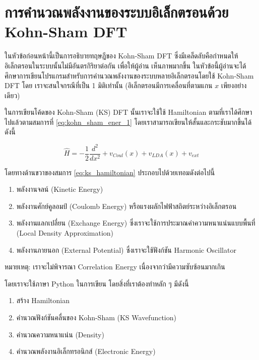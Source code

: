 \section{การคำนวณพลังงานของระบบอิเล็กตรอนด้วย Kohn-Sham DFT}
\label{sec:calc_ener_kohn_sham}

ในหัวข้อก่อนหน้านี้เป็นการอธิบายทฤษฎีของ Kohn-Sham DFT ซึ่งมีเคล็ดลับคือกำหนดให้อิเล็กตรอนในระบบนั้นไม่มีอันตรกิริยาต่อกัน เพื่อให้ผู้อ่าน%
เห็นภาพมากขึ้น ในหัวข้อนี้ผู้อ่านจะได้ศึกษาการเขียนโปรแกรมสำหรับการคำนวณพลังงานของระบบหลายอิเล็กตรอนโดยใช้ Kohn-Sham DFT โดย%
เราจะสนใจกรณีที่เป็น 1 มิติเท่านั้น (อิเล็กตรอนมีการเคลื่อนที่ตามแกน $x$ เพียงอย่างเดียว)

ในการเขียนโค้ดของ Kohn-Sham (KS) DFT นั้นเราจะใช้ใช้ Hamiltonian ตามที่เราได้ศึกษาไปแล้วตามสมการที่ \ref{eq:kohn_sham_ener_1} 
โดยเราสามารถเขียนให้สั้นและกระชับมากขึ้นได้ ดังนี้

\begin{equation}\label{eq:ks_hamiltonian}
    \hat{H} = -\frac{1}{2} \frac{d^2}{dx^2} + v_{Coul}(x) + v_{LDA}(x) + v_{ext}
\end{equation}

\noindent โดยทางด้านขวาของสมการ \ref{eq:ks_hamiltonian} ประกอบไปด้วยเทอมดังต่อไปนี้

\begin{enumerate}[topsep=0pt,noitemsep]
    \item พลังงานจลน์ (Kinetic Energy)

    \item พลังงานศักย์คูลอมป์ (Coulomb Energy) หรือแรงผลักไฟฟ้าสถิตย์ระหว่างอิเล็กตรอน
    
    \item พลังงานแลกเปลี่ยน (Exchange Energy) ซึ่งเราจะใช้การประมาณค่าความหนาแน่นแบบพื้นที่ (Local Density Approximation) 
    
    \item พลังงานภายนอก (External Potential) ซึ่งเราจะใช้ฟังก์ชัน Harmonic Oscillator
\end{enumerate}

\noindent หมายเหตุ: เราจะไม่พิจารณา Correlation Energy เนื่องจากว่ามีความซับซ้อนมากเกิน

โดยเราจะใช้ภาษา Python ในการเขียน โดยสิ่งที่เราต้องทำหลัก ๆ มีดังนี้

\begin{enumerate}[topsep=0pt,noitemsep]
    \item สร้าง Hamiltonian
    
    \item คำนวณฟังก์ชันคลื่นของ Kohn-Sham (KS Wavefunction)
    
    \item คำนวณความหนาแน่น (Density)
    
    \item คำนวณพลังงานอิเล็กทรอนิกส์ (Electronic Energy)
\end{enumerate}

